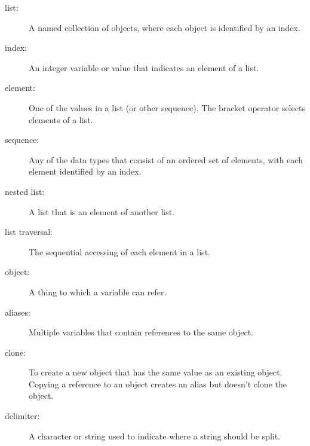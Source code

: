 \begin{description}

\item[list:] A named collection of objects, where each object is
identified by an index.

\item[index:] An integer variable or value that indicates an element of a
list.

\item[element:] One of the values in a list (or other sequence).  The
bracket operator selects elements of a list.

\item[sequence:] Any of the data types that consist of an ordered set of
elements, with each element identified by an index.

\item[nested list:] A list that is an element of another list.

\item[list traversal:] The sequential accessing of each element in a list.

\item[object:] A thing to which a variable can refer.

\item[aliases:] Multiple variables that contain references to the same object.

\item[clone:] To create a new object that has the same value as an
existing object.  Copying a reference to an object creates an alias
but doesn't clone the object.

\item[delimiter:] A character or string used to indicate where a
string should be split.


\end{description}
